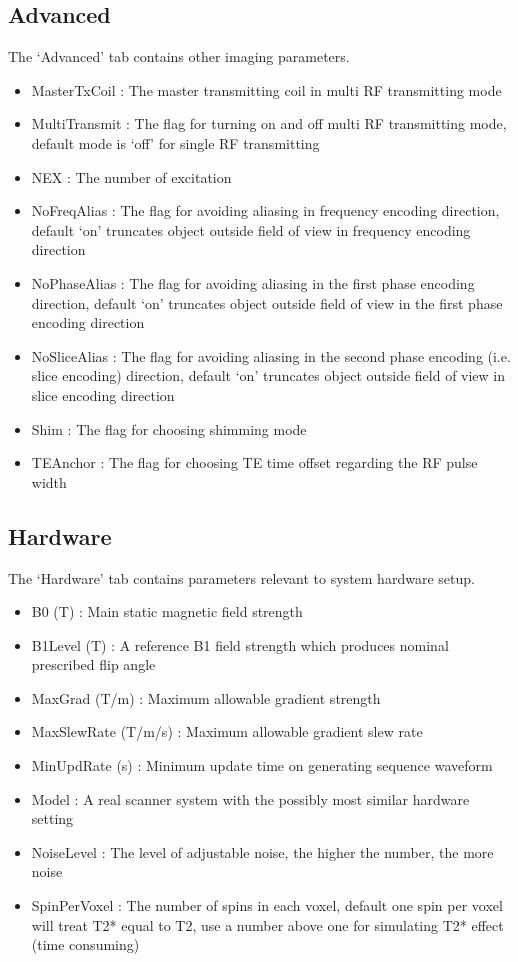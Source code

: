 \documentclass{book}%
\begin{document}
\subsection{Advanced}
The `Advanced' tab contains other imaging parameters.
	\begin{itemize}
		\item MasterTxCoil : The master transmitting coil in multi RF transmitting mode
		\item MultiTransmit : The flag for turning on and off multi RF transmitting mode, default mode is `off' for single RF transmitting
		\item NEX : The number of excitation
	  \item NoFreqAlias : The flag for avoiding aliasing in frequency encoding direction, default `on' truncates object outside field of view in frequency encoding direction
		\item NoPhaseAlias : The flag for avoiding aliasing in the first phase encoding direction, default `on' truncates object outside field of view in the first phase encoding direction
		\item NoSliceAlias : The flag for avoiding aliasing in the second phase encoding (i.e. slice encoding) direction, default `on' truncates object outside field of view in slice encoding direction
		\item Shim : The flag for choosing shimming mode
		\item TEAnchor : The flag for choosing TE time offset regarding the RF pulse width
	\end{itemize}

\subsection{Hardware}
The `Hardware' tab contains parameters relevant to system hardware setup.
	\begin{itemize}
		\item B0 (T) : Main static magnetic field strength
		\item B1Level (T) : A reference B1 field strength which produces nominal prescribed flip angle
		\item MaxGrad (T/m) : Maximum allowable gradient strength
	  \item MaxSlewRate (T/m/s) : Maximum allowable gradient slew rate
		\item MinUpdRate (s) : Minimum update time on generating sequence waveform
		\item Model : A real scanner system with the possibly most similar hardware setting
		\item NoiseLevel :  The level of adjustable noise, the higher the number, the more noise
		\item SpinPerVoxel : The number of spins in each voxel, default one spin per voxel will treat T2* equal to T2, use a number above one for simulating T2* effect (time consuming)
	\end{itemize}
\end{document}
